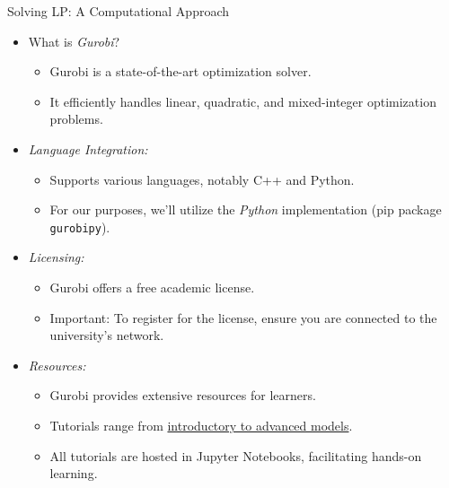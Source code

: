 \documentclass[
    NAME={Dr. Helga Ingimundardóttir},
    EMAIL={helgaingim@hi.is},
    FACULTY={Industrial Engineering},
    TITLE={Linear Optimization},
    SUBTITLE={Fundamentals and Applications},
    SEMINAR={VÉL113F},
    DATE={Design and Optimization}
]{HI-latex/hi-beamer}
\begin{document}
    \begin{frame}{Solving LP: A Computational Approach}
        \begin{itemize}
            \item What is \emph{Gurobi}?
            \begin{itemize}
                \item Gurobi is a state-of-the-art optimization solver.
                \item It efficiently handles linear, quadratic, and mixed-integer optimization problems.
            \end{itemize}

            \item \emph{Language Integration:}
            \begin{itemize}
                \item Supports various languages, notably C++ and Python.
                \item For our purposes, we'll utilize the \emph{Python} implementation (pip package \texttt{gurobipy}).
            \end{itemize}

            \item \emph{Licensing:}
            \begin{itemize}
                \item Gurobi offers a free academic license.
                \item \alert{Important:} To register for the license, ensure you are connected to the university's network.
            \end{itemize}

            \item \emph{Resources:}
            \begin{itemize}
                \item Gurobi provides extensive resources for learners.
                \item Tutorials range from \href{https://www.gurobi.com/jupyter_models/}{introductory to advanced models}.
                \item All tutorials are hosted in Jupyter Notebooks, facilitating hands-on learning.
            \end{itemize}

        \end{itemize}

    \end{frame}
\end{document}
